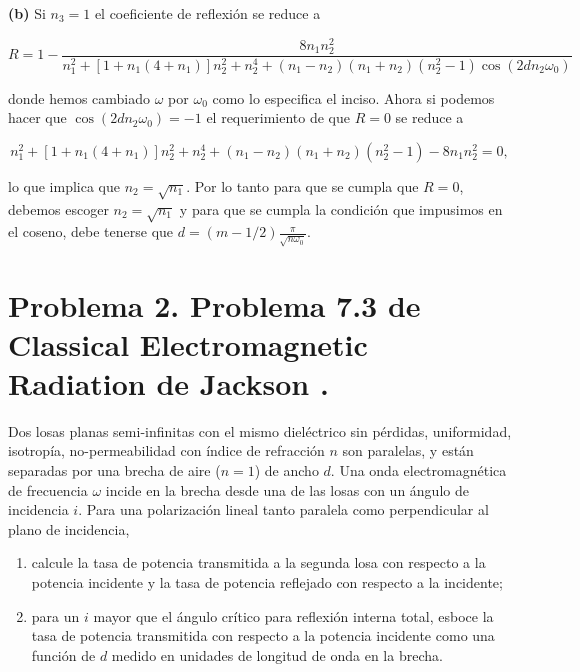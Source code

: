 \documentclass[a4paper,11pt]{article}
\numberwithin{equation}{section}
\begin{document}
\textbf{(b)} Si $n_3 = 1$ el coeficiente de reflexión se reduce a 

\begin{equation}
 R = 1 - \frac{8n_1 n_2^2}{n_1^2 + [1 + n_1(4 + n_1)]n_2^2 + n_2^4 + 
 (n_1 - n_2)(n_1 + n_2)(n_2^2 - 1)\cos{(2 d n_2 \omega_0)}}
\end{equation}

donde hemos cambiado $\omega$ por $\omega_0$ como lo especifica el inciso. Ahora 
si podemos hacer que $\cos{(2 d n_2 \omega_0)} = -1$ el requerimiento de que $R = 0$ 
se reduce a 

\begin{equation}
 n_1^2 + [1 + n_1(4 + n_1)]n_2^2 + n_2^4 + 
 (n_1 - n_2)(n_1 + n_2)(n_2^2 - 1) - 8n_1 n_2^2 = 0,
\end{equation}

lo que implica que $n_2 = \sqrt{n_1}$. Por lo tanto para que se cumpla que $R=0$, debemos 
escoger $n_2 = \sqrt{n_1}$ y para que se cumpla la condición que impusimos en el 
coseno, debe tenerse que $d = (m - 1/2)\frac{\pi}{\sqrt{n\omega_0}}$.

\newpage

\section{Problema 2. Problema 7.3 de Classical Electromagnetic Radiation
de Jackson \cite{jackson}.}

Dos losas planas semi-infinitas con el mismo dieléctrico sin pérdidas, uniformidad,
isotropía, no-permeabilidad con índice de refracción $n$ son paralelas, y están 
separadas por una brecha de aire ($n = 1$) de ancho $d$. Una onda electromagnética 
de frecuencia $\omega$ incide en la brecha desde una de las losas con un ángulo 
de incidencia $i$. Para una polarización lineal tanto paralela como perpendicular 
al plano de incidencia,

\begin{enumerate}[label=\textbf{(\alph*)}]
 \item calcule la tasa de potencia transmitida a la segunda losa con respecto 
 a la potencia incidente y la tasa de potencia reflejado con respecto a la incidente;
 \item para un $i$ mayor que el ángulo crítico para reflexión interna total, 
 esboce la tasa de potencia transmitida con respecto a la potencia incidente 
 como una función de $d$ medido en unidades de longitud de onda en la brecha.
\end{enumerate}
\end{document}
